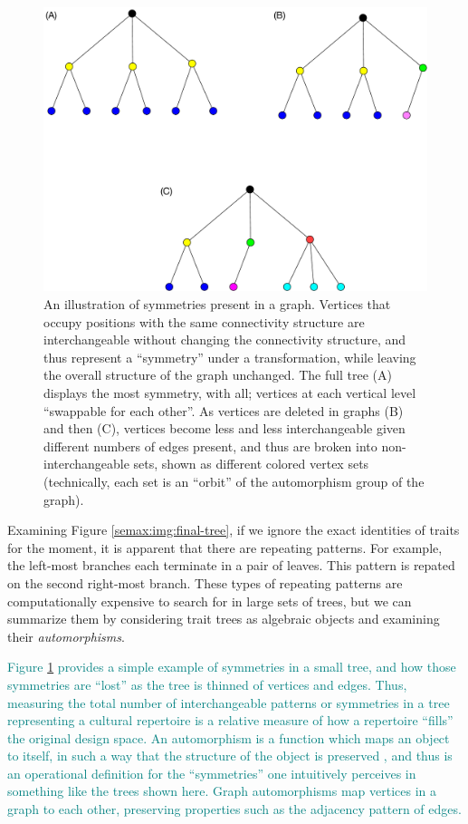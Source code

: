 \begin{figure}[htbp] 
  \centering 
  \includegraphics[scale=0.5]{graphics/semanticaxelrod/graph-symmetries.pdf} 
  \caption{An illustration of symmetries present in a graph.  Vertices that occupy positions with the same connectivity structure are interchangeable without changing the connectivity structure, and thus represent a ``symmetry'' under a transformation, while leaving the overall structure of the graph unchanged.  The full tree (A) displays the most symmetry, with all; vertices at each vertical level ``swappable for each other''.  As vertices are deleted in graphs (B) and then (C), vertices become less and less interchangeable given different numbers of edges present, and thus are broken into non-interchangeable sets, shown as different colored vertex sets (technically, each set is an ``orbit'' of the automorphism group of the graph).} 
  \label{semax:img:graph-symmetries} 
  \end{figure}

Examining Figure \ref{semax:img:final-tree}, if we ignore the exact identities
of traits for the moment, it is apparent that there are repeating
patterns. For example, the left-most branches each terminate in a pair
of leaves. This pattern is repated on the second right-most branch.
These types of repeating patterns are computationally expensive to
search for in large sets of trees, but we can summarize them by
considering trait trees as algebraic objects and examining their
\emph{automorphisms}.

\textcolor{teal}{Figure \ref{semax:img:graph-symmetries} provides a simple example of symmetries in a small tree, and how those symmetries are ``lost'' as the tree is thinned of vertices and edges.  Thus, measuring the total number of interchangeable patterns or symmetries in a tree representing a cultural repertoire is a relative measure of how a repertoire ``fills'' the original design space.  
An automorphism is a function which maps an object to itself, in such a
way that the structure of the object is preserved
\citep{rotman1995introduction}, and thus is an operational definition for the ``symmetries'' one intuitively perceives in something like the trees shown here. Graph automorphisms map vertices in a
graph to each other, preserving properties such as the adjacency pattern
of edges. }

